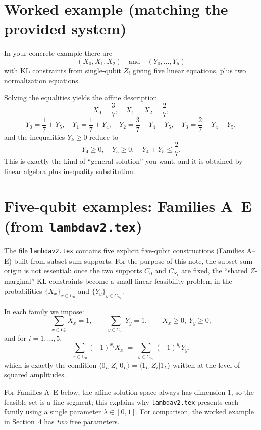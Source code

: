\documentclass[11pt]{article}
\begin{document}
\section{Worked example (matching the provided system)}

In your concrete example there are
\[
(X_0,X_1,X_2)\quad \text{and}\quad (Y_0,\dots,Y_5)
\]
with KL constraints from single-qubit $Z_i$ giving five linear equations, plus two normalization equations.

Solving the equalities yields the affine description
\[
X_0 = \frac{3}{7},\quad X_1=X_2=\frac{2}{7},
\]
\[
Y_0 = \frac{1}{7}+Y_5,\quad Y_1=\frac{1}{7}+Y_4,\quad
Y_2=\frac{3}{7}-Y_4-Y_5,\quad Y_3=\frac{2}{7}-Y_4-Y_5,
\]
and the inequalities $Y_k\ge 0$ reduce to
\[
Y_4\ge 0,\quad Y_5\ge 0,\quad Y_4+Y_5\le \frac{2}{7}.
\]
This is exactly the kind of ``general solution'' you want, and it is obtained by linear algebra plus inequality substitution.


\section{Five-qubit examples: Families A--E (from \texttt{lambdav2.tex})}

The file \texttt{lambdav2.tex} contains five explicit five-qubit constructions (Families A--E) built from subset-sum supports.
For the purpose of this note, the subset-sum origin is not essential: once the two supports $C_0$ and $C_{S_1}$ are fixed, the ``shared $Z$-marginal'' KL constraints become a small linear feasibility problem in the probabilities $\{X_x\}_{x\in C_0}$ and $\{Y_y\}_{y\in C_{S_1}}$.

In each family we impose:
\[
\sum_{x\in C_0} X_x = 1,\qquad \sum_{y\in C_{S_1}} Y_y = 1,\qquad X_x\ge 0,\ Y_y\ge 0,
\]
and for $i=1,\dots,5$,
\[
\sum_{x\in C_0} (-1)^{x_i} X_x \;=\; \sum_{y\in C_{S_1}} (-1)^{y_i} Y_y,
\]
which is exactly the condition $\langle 0_L|Z_i|0_L\rangle=\langle 1_L|Z_i|1_L\rangle$ written at the level of squared amplitudes.

For Families A--E below, the affine solution space always has dimension $1$, so the feasible set is a line segment; this explains why \texttt{lambdav2.tex} presents each family using a single parameter $\lambda\in[0,1]$.
For comparison, the worked example in Section~4 has \emph{two} free parameters.
\end{document}
